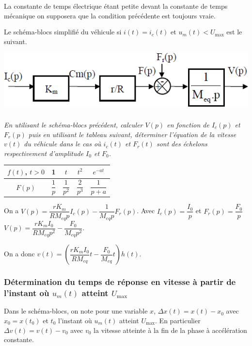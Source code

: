 \documentclass[10pt,fleqn]{article} %
\begin{document}
La constante de temps électrique étant petite devant la constante de temps mécanique on supposera que la condition précédente est toujours vraie.

Le schéma-blocs simplifié du véhicule si $i(t)=i_c(t)$ et $u_m(t)<U_{\text{max}}$ est le suivant.


\begin{center}
\includegraphics[width=\linewidth]{images/ccmp_03}
\end{center}


\subparagraph{}
\textit{En utilisant le schéma-blocs précédent, calculer $V(p)$ en fonction de $I_c(p)$ et $F_r(p)$ puis en utilisant le
tableau suivant, déterminer l’équation de la vitesse $v(t)$ du véhicule dans le cas où $i_c(t)$ et $F_r(t)$
sont des échelons respectivement d’amplitude $I_0$ et $F_0$.}

\begin{center}
\begin{tabular}{|c|c|c|c|c|}
\hline
$f(t)$, $t>0$ & 1 & $t$ & $t^2$ & $e^{-at}$  \\
\hline
$F(p)$ & $\dfrac{1}{p}$ & $\dfrac{1}{p^2}$ & $\dfrac{2}{p^3}$ & $\dfrac{1}{p+a}$ \\
\hline
\end{tabular}
\end{center}

\ifprof
\begin{corrige}
On a $V(p)= \dfrac{rK_m}{RM_{eq}p}I_c(p) - \dfrac{1}{M_{eq}p} F_r(p)$.
Avec $I_c(p) =\dfrac{I_0}{p}$ et $F_r(p) =\dfrac{F_0}{p}$
$V(p)= \dfrac{rK_mI_0}{RM_{eq}p^2} - \dfrac{F_0}{M_{eq}p^2} $.

On a donc $v(t)= \left( \dfrac{rK_mI_0}{RM_{eq}}t - \dfrac{F_0}{M_{eq}}t\right) h(t) $.

\end{corrige}
\else
\fi

\subsubsection*{Détermination du temps de réponse en vitesse à partir de l’instant où $u_m(t)$ atteint $U_{\text{max}}$}

Dans le schéma-blocs, on note pour une variable $x$, $\Delta x(t)=x(t) - x_0$ avec $x_0=x\left(t_0\right)$ et $t_0$ l’instant où $u_m(t)$
atteint $U_{\text{max}}$. En particulier $\Delta v(t) = v(t) -v_0$ avec $v_0$ la vitesse atteinte à la fin de la phase à accélération constante.
\end{document}
